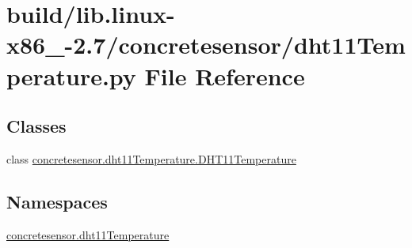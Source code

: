 \hypertarget{build_2lib_8linux-x86__64-2_87_2concretesensor_2dht11Temperature_8py}{}\section{build/lib.linux-\/x86\+\_-\/2.7/concretesensor/dht11\+Temperature.py File Reference}
\label{build_2lib_8linux-x86__64-2_87_2concretesensor_2dht11Temperature_8py}
\subsection*{Classes}
\begin{DoxyCompactItemize}
\item 
class \hyperlink{classconcretesensor_1_1dht11Temperature_1_1DHT11Temperature}{concretesensor.\+dht11\+Temperature.\+D\+H\+T11\+Temperature}
\end{DoxyCompactItemize}
\subsection*{Namespaces}
\begin{DoxyCompactItemize}
\item 
 \hyperlink{namespaceconcretesensor_1_1dht11Temperature}{concretesensor.\+dht11\+Temperature}
\end{DoxyCompactItemize}
